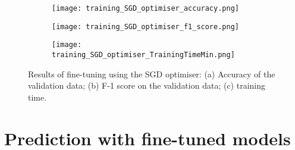 \documentclass[a4paper,12pt]{article}
\newcommand{\figwidthh}{0.48\textwidth}
\begin{document}
\begin{figure}[h!] 
	\begin{center}
		\begin{subfigure}[b]{\figwidthh}
			\caption{} 
			\texttt{[image: training\_SGD\_optimiser\_accuracy.png]}
		\end{subfigure}
        \hfill
		\begin{subfigure}[b]{\figwidthh}
			\caption{}
			\texttt{[image: training\_SGD\_optimiser\_f1\_score.png]}
		\end{subfigure}
        \hfill
		\begin{subfigure}[b]{\figwidthh}
			\caption{}
			\texttt{[image: training\_SGD\_optimiser\_TrainingTimeMin.png]}
		\end{subfigure}
	\end{center}
	\caption{Results of fine-tuning using the SGD optimiser: (a) Accuracy of the validation data; (b) F-1 score on the validation data; (c) training time. 
	} 
	\label{fig:res_training_SGD}
\end{figure}

\newpage



\clearpage

\section{Prediction with fine-tuned models}
\end{document}
